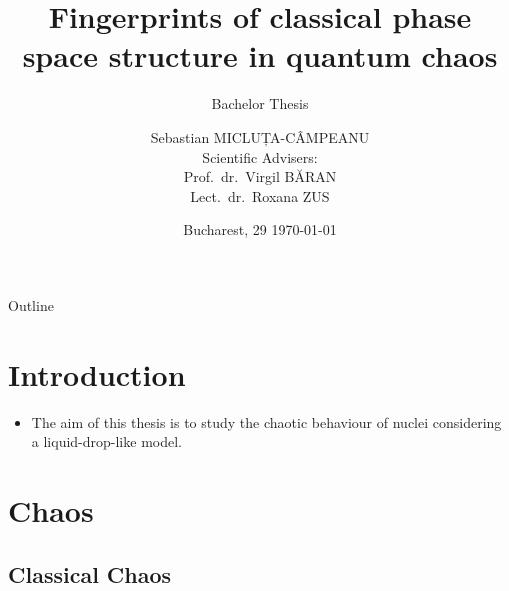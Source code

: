 \documentclass[a4,compress]{beamer}
\title[Fingerprints of classical structures in quantum chaos]{Fingerprints of classical phase space structure in quantum chaos}
\subtitle{Bachelor Thesis}
\author{
  Sebastian MICLUȚA-CÂMPEANU \\
  \hspace{6cm} {\small	Scientific Advisers:} \\
  \hspace{6.35cm} {\small Prof.~dr.~Virgil BĂRAN} \\
  \hspace{6.35cm} {\small Lect.~dr.~Roxana ZUS}
}
\institute[Universitatea din București]
{
  Universitatea din București \\
  Facultatea de Fizică
}
\date{\small Bucharest, 29 \printdayoff\today}
\begin{document}

\begin{frame}
 \titlepage
\end{frame}



\begin{frame}{Outline}
  \tableofcontents[]%
\end{frame}

\section[Intro]{Introduction}


\begin{frame}
  \begin{itemize}
    \item The aim of this thesis is to study the chaotic behaviour
    of nuclei considering a liquid-drop-like model.
  \end{itemize}
\end{frame}

\section{Chaos}

\subsection{Classical Chaos}


\end{document}
